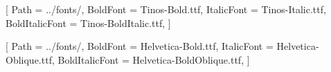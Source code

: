 \usepackage{fontspec}

\setmainfont{Tinos-Regular.ttf}[
  Path = ../fonts/,
  BoldFont = Tinos-Bold.ttf,
  ItalicFont = Tinos-Italic.ttf,
  BoldItalicFont = Tinos-BoldItalic.ttf,
]

\setsansfont{Helvetica.ttf}[
  Path = ../fonts/,
  BoldFont = Helvetica-Bold.ttf,
  ItalicFont = Helvetica-Oblique.ttf,
  BoldItalicFont = Helvetica-BoldOblique.ttf,
]

